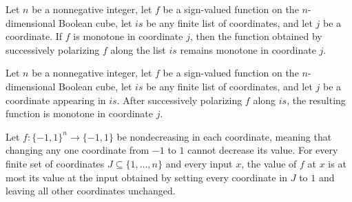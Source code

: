 \begin{theorem}
\label{FABL.isMonotoneInCoordinate_polarizeCoordinates}
\leanok
{}
Let $n$ be a nonnegative integer, let $f$ be a sign-valued function on the
$n$-dimensional Boolean cube, let $is$ be any finite list of coordinates, and let $j$ be
a coordinate. If $f$ is monotone in coordinate $j$, then the function obtained by
successively polarizing $f$ along the list $is$ remains monotone in coordinate $j$.
\end{theorem}

\begin{theorem}
\label{FABL.isMonotoneInCoordinate_polarizeCoordinates_of_mem}
\leanok
{}
Let $n$ be a nonnegative integer, let $f$ be a sign-valued function on the
$n$-dimensional Boolean cube, let $is$ be any finite list of coordinates, and let $j$ be
a coordinate appearing in $is$. After successively polarizing $f$ along $is$, the
resulting function is monotone in coordinate $j$.
\end{theorem}

\begin{theorem}
\label{FABL.le_bribeInput_one_of_isMonotoneInCoordinate}
\leanok
{}
Let $f:\{−1,1\}^n\to\{−1,1\}$ be nondecreasing in each coordinate, meaning that changing
any one coordinate from $-1$ to $1$ cannot decrease its value. For every finite set of
coordinates $J\subseteq\{1,\ldots,n\}$ and every input $x$, the value of $f$ at $x$ is
at most its value at the input obtained by setting every coordinate in $J$ to $1$ and
leaving all other coordinates unchanged.
\end{theorem}


